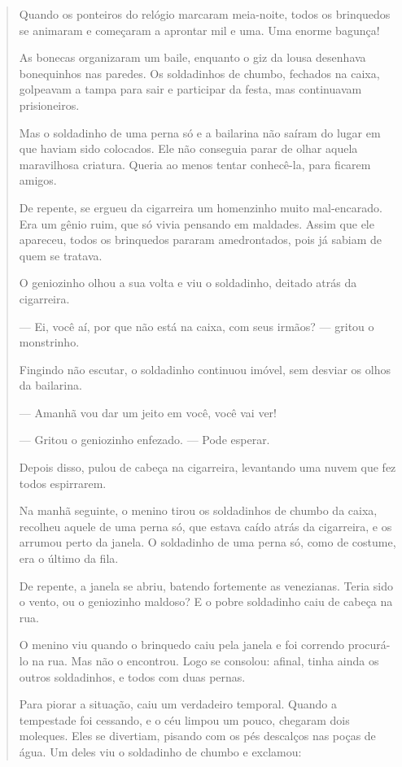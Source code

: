 \begin{itemize}
{{{\begin{itemize}
\begin{itemize}
\begin{itemize}
\begin{quote}
Quando os ponteiros do relógio marcaram meia-noite, todos os brinquedos
se animaram e começaram a aprontar mil e uma. Uma enorme bagunça!

As bonecas organizaram um baile, enquanto o giz da lousa desenhava
bonequinhos nas paredes. Os soldadinhos de chumbo, fechados na caixa,
golpeavam a tampa para sair e participar da festa, mas continuavam
prisioneiros.

Mas o soldadinho de uma perna só e a bailarina não saíram do lugar em
que haviam sido colocados. Ele não conseguia parar de olhar aquela
maravilhosa criatura. Queria ao menos tentar conhecê-la, para ficarem
amigos.

De repente, se ergueu da cigarreira um homenzinho muito mal-encarado.
Era um gênio ruim, que só vivia pensando em maldades. Assim que ele
apareceu, todos os brinquedos pararam amedrontados, pois já sabiam de
quem se tratava.

O geniozinho olhou a sua volta e viu o soldadinho, deitado atrás da
cigarreira.

--- Ei, você aí, por que não está na caixa, com seus irmãos? --- gritou
o monstrinho.

Fingindo não escutar, o soldadinho continuou imóvel, sem desviar os
olhos da bailarina.

--- Amanhã vou dar um jeito em você, você vai ver!

--- Gritou o geniozinho enfezado. --- Pode esperar.

Depois disso, pulou de cabeça na cigarreira, levantando uma nuvem que
fez todos espirrarem.

Na manhã seguinte, o menino tirou os soldadinhos de chumbo da caixa,
recolheu aquele de uma perna só, que estava caído atrás da cigarreira, e
os arrumou perto da janela. O soldadinho de uma perna só, como de
costume, era o último da fila.

De repente, a janela se abriu, batendo fortemente as venezianas. Teria
sido o vento, ou o geniozinho maldoso? E o pobre soldadinho caiu de
cabeça na rua.

O menino viu quando o brinquedo caiu pela janela e foi correndo
procurá-lo na rua. Mas não o encontrou. Logo se consolou: afinal, tinha
ainda os outros soldadinhos, e todos com duas pernas.

Para piorar a situação, caiu um verdadeiro temporal. Quando a tempestade
foi cessando, e o céu limpou um pouco, chegaram dois moleques. Eles se
divertiam, pisando com os pés descalços nas poças de água. Um deles viu
o soldadinho de chumbo e exclamou:


\end{quote}
\end{itemize}
\end{itemize}
\end{itemize}}}}
\end{itemize}
